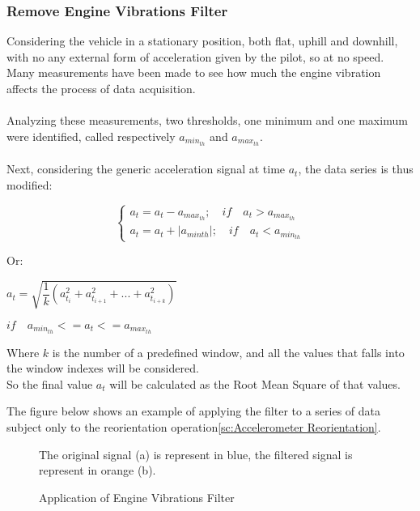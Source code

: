 \documentclass[tesi]{subfiles}
\begin{document}
\subsubsection{Remove Engine Vibrations Filter} \label{sssc:Remove Engine Vibrations Filter}
Considering the vehicle in a stationary position, both flat, uphill and downhill, with no any external form of acceleration given by the pilot, so at no speed. Many measurements have been made to see how much the engine vibration affects the process of data acquisition.\\\\
Analyzing these measurements, two thresholds, one minimum and one maximum were identified, called respectively \textbf{$a_{min_{th}}$} and \textbf{$a_{max_{th}}$}.\\\\
Next, considering the generic acceleration signal at time $a_{t}$, the data series is thus modified:


\begin{center}
\[
    \left\{
                \begin{array}{ll}
                  a_{t} = a_{t} - a_{max_{th}}; \quad 	if \quad a_{t} > a_{max_{th}}\\
              	  a_{t} = a_{t} + |a_{min{th}}|; \quad  if \quad a_{t} < a_{min_{th}}
                \end{array}
              \right.
\]
\end{center}
\clearpage
\noindent Or:

\begin{center}
$a_{t} = \sqrt{\dfrac{1}{k} (a_{t_{i}}^{2} + a_{t_{i+1}}^{2} + ... + a_{t_{i+k}}^{2} )} $\\
\end{center}
\begin{center}
$if\quad  a_{min_{th}} <= a_{t} <= a_{max_{th}} $


Where $k$ is the number of a predefined window, and all the values that falls into the window indexes will be considered.\\ 
So the final value $a_{t}$ will be calculated as the Root Mean Square of that values.
\end{center}

\noindent The figure below shows an example of applying the filter to a series of data subject only to the reorientation operation\ref{sc:Accelerometer Reorientation}.

\begin{figure}[H]	


\centering
{}

The original signal (a) is represent in blue, the filtered signal is represent in orange (b).
 \caption{Application of Engine Vibrations Filter}
  \label{fig:Application of Engine Vibrations Filter.}
\end{figure}
\end{document}
